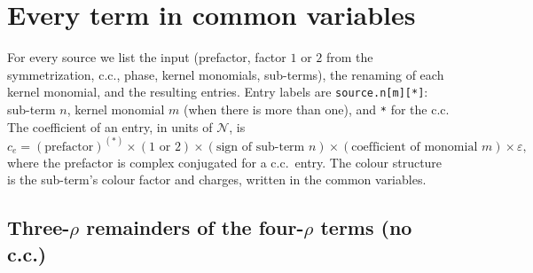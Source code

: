 \documentclass[10pt]{article}
\numberwithin{equation}{section}
\newcommand{\NN}{\mathcal N}
\newcommand{\lab}[1]{\texttt{#1}}
\begin{document}
\section{Every term in common variables}\label{sec:entries}

For every source we list the input (prefactor, factor $1$ or $2$ from the symmetrization, c.c., phase, kernel monomials, sub-terms), the renaming of each kernel monomial, and the resulting entries. Entry labels are \lab{source.n[m][*]}: sub-term $n$, kernel monomial $m$ (when there is more than one), and \lab{*} for the c.c. The coefficient of an entry, in units of $\NN$, is
\begin{equation}
c_e=(\text{prefactor})^{(*)}\times(1\text{ or }2)\times(\text{sign of sub-term }n)\times(\text{coefficient of monomial }m)\times\varepsilon,
\end{equation}
where the prefactor is complex conjugated for a c.c.\ entry. The colour structure is the sub-term's colour factor and charges, written in the common variables.

\subsection*{Three-$\rho$ remainders of the four-$\rho$ terms (no c.c.)}

\end{document}
